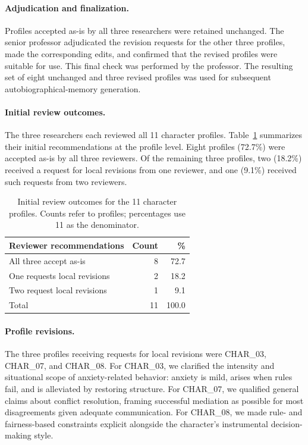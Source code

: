 \documentclass[11pt]{article}
\begin{document}
\paragraph{Adjudication and finalization.}
Profiles accepted as-is by all three researchers were retained unchanged. The senior professor adjudicated the revision requests for the other three profiles, made the corresponding edits, and confirmed that the revised profiles were suitable for use. This final check was performed by the professor. The resulting set of eight unchanged and three revised profiles was used for subsequent autobiographical-memory generation.

\paragraph{Initial review outcomes.}
The three researchers each reviewed all 11 character profiles. Table~\ref{tab:profile_review_outcomes} summarizes their initial recommendations at the profile level. Eight profiles (72.7\%) were accepted as-is by all three reviewers. Of the remaining three profiles, two (18.2\%) received a request for local revisions from one reviewer, and one (9.1\%) received such requests from two reviewers.

\begin{table}[t]
\centering
\caption{Initial review outcomes for the 11 character profiles. Counts refer to profiles; percentages use 11 as the denominator.}
\label{tab:profile_review_outcomes}
\small
\setlength{\tabcolsep}{3pt}
\begin{tabularx}{\linewidth}{Xrr}
\toprule
\textbf{Reviewer recommendations} & \textbf{Count} & \textbf{\%} \\
\midrule
All three accept as-is & 8 & 72.7 \\
One requests local revisions & 2 & 18.2 \\
Two request local revisions & 1 & 9.1 \\
\midrule
Total & 11 & 100.0 \\
\bottomrule
\end{tabularx}
\end{table}

\paragraph{Profile revisions.}
The three profiles receiving requests for local revisions were CHAR\_03, CHAR\_07, and CHAR\_08. For CHAR\_03, we clarified the intensity and situational scope of anxiety-related behavior: anxiety is mild, arises when rules fail, and is alleviated by restoring structure. For CHAR\_07, we qualified general claims about conflict resolution, framing successful mediation as possible for most disagreements given adequate communication. For CHAR\_08, we made rule- and fairness-based constraints explicit alongside the character's instrumental decision-making style.
\end{document}
